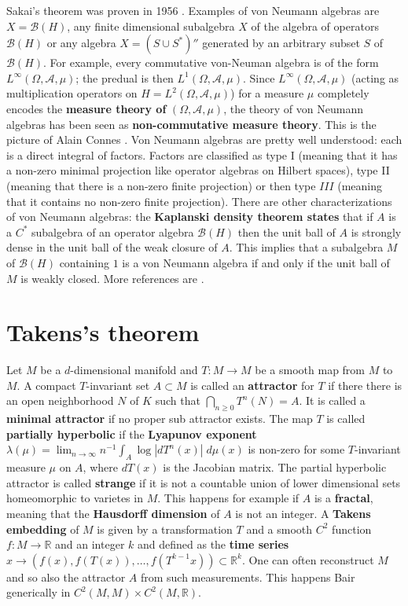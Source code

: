 \documentclass[12pt]{amsart}
\newcounter{example}    \def\example#1{ \item \fontsize{12}{15} \selectfont #1 \fontsize{12}{15} \selectfont }
\begin{document}
Sakai's theorem was proven in 1956 \cite{Sakai1956}.
Examples of von Neumann algebras are $X=\mathcal{B}(H)$, any finite dimensional subalgebra $X$ of the algebra
of operators $\mathcal{B}(H)$ or any algebra $X=(S \cup S^*)''$ generated by an arbitrary subset $S$ of $\mathcal{B}(H)$.
For example, every commutative von-Neuman algebra is of the form $L^{\infty}(\Omega,\mathcal{A},\mu)$;
the predual is then $L^1(\Omega,\mathcal{A},\mu)$. Since $L^{\infty}(\Omega,\mathcal{A},\mu)$ (acting as
multiplication operators on $H=L^2(\Omega,\mathcal{A},\mu)$)
for a measure $\mu$ completely encodes the {\bf measure theory of} $(\Omega,\mathcal{A},\mu)$, 
the theory of von Neumann algebras has been seen as {\bf non-commutative measure theory}.
This is the picture of Alain Connes \cite{Connes}. Von Neumann algebras are pretty well understood: each is a direct
integral of factors. Factors are classified as type I (meaning that it has a non-zero minimal projection like 
operator algebras on Hilbert spaces), type II (meaning that there is a non-zero finite projection) or then type $III$
(meaning that it contains no non-zero finite projection). There are other characterizations of von Neumann algebras:
the {\bf Kaplanski density theorem states} that if $A$ is a $C^*$ subalgebra of an operator algebra $\mathcal{B}(H)$
then the unit ball of $A$ is strongly dense in the unit ball of the weak closure of $A$.
This implies that a subalgebra $M$ of $\mathcal{B}(H)$ containing $1$ is a 
von Neumann algebra if and only if the unit ball of $M$ is weakly closed. More references are
\cite{ReedSimon,Blackadar2005,Dixmier,Jones2015}.


\section{Takens's theorem}

Let $M$ be a $d$-dimensional manifold and $T:M \to M$ be a smooth map from $M$ to $M$.
A compact $T$-invariant set $A \subset M$ is called an {\bf attractor} for $T$
if there there is an open neighborhood $N$ of $K$ such that 
$\bigcap_{n \geq 0} T^n(N)= A$. It is called a {\bf minimal attractor} if no
proper sub attractor exists. 
The map $T$ is called {\bf partially hyperbolic} if the {\bf Lyapunov exponent}
$\lambda(\mu) = \lim_{n \to \infty} n^{-1} \int_A  \log|dT^n(x)| \; d\mu(x)$ is non-zero
for some $T$-invariant measure $\mu$ on $A$, where $dT(x)$ is the Jacobian matrix.
The partial hyperbolic attractor is called {\bf strange} if it is not a countable union
of lower dimensional sets homeomorphic to varietes in $M$. 
This happens for example if $A$ is a {\bf fractal}, meaning that the 
{\bf Hausdorff dimension} of $A$ is not an integer. 
A {\bf Takens embedding} of $M$ is given by a transformation $T$ and a smooth $C^2$ function
$f:M \to \mathbb{R}$ and an integer $k$ and defined as the 
{\bf time series} $x \to (f(x),f(T(x)),\dots,f(T^{k-1}x)) \subset \mathbb{R}^k$.  
One can often reconstruct $M$ and so also the attractor $A$ from such measurements.
This happens Bair generically in $C^2(M,M) \times C^2(M, \mathbb{R})$.     
\end{document}
